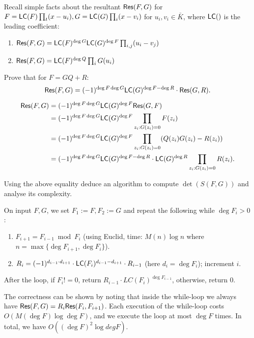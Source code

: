 \documentclass[11pt]{exam}
\theoremstyle{definition}
\begin{document}
{	 Recall simple facts about the resultant $\mathsf{Res}(F,G)$ for $F = \mathsf{LC}(F) \prod_t (x-u_i), G = \mathsf{LC}(G) \prod_i(x-v_i)$ for $u_i, v_i \in \bar{K}$, where $\mathsf{LC}()$ is the leading coefficient:
	\begin{enumerate}
		\item $\mathsf{Res}(F,G) = \mathsf{LC}(F)^{\deg G} \mathsf{LC}(G)^{\deg F} \prod_{i,j}(u_i - v_j)$
		\item $\mathsf{Res}(F,G) = \mathsf{LC}(F)^{\deg Q} \prod_i G(u_i)$
	\end{enumerate}
	\begin{questions}
	\question Prove that for $F = GQ + R$:
	\[
		\mathsf{Res}(F, G) = (-1)^{\deg F \deg G} \mathsf{LC}(G)^{\deg F - \deg R} \cdot \mathsf{Res}(G,R).
	\]
	\vspace{-20pt}
	\begin{solution}
		\vspace{-20pt}
		\begin{align*}
			\mathsf{Res}(F,G) &= (-1)^{\deg F \deg G} \mathsf{LC}(G)^{\deg F} \mathsf{Res}(G,F) \\
			& = (-1)^{\deg F \deg G} \mathsf{LC}(G)^{\deg F} \prod_{z_i : G(z_i)=0} F(z_i) \\
			& = (-1)^{\deg F \deg G} \mathsf{LC}(G)^{\deg F} \prod_{z_i : G(z_i)=0} (Q(z_i)G(z_i) - R(z_i)) \\
			& = (-1)^{\deg F \deg G} \mathsf{LC}(G)^{\deg F - \deg R} \cdot \mathsf{LC}(G)^{\deg R} \prod_{z_i : G(z_i)=0} R(z_i).
		\end{align*}
			
	\end{solution}
	\question Using the above equality deduce an algorithm to compute $\det(S(F,G))$ and analyse its complexity. 
	\begin{solution}
		On input $F, G$, we set $F_1 :=F, F_2:=G$ and repeat the following while $\deg F_i >0$: 
		\begin{enumerate}
			\item $F_{i+1} = F_{i-1} \bmod F_i$ (using Euclid, time: $M(n) \log n$ where $n=\max\{\deg F_{i+1}, \deg F_i\}$).
			\item $R_i = (-1)^{d_{i-1} \cdot d_{i+1}} \cdot \mathsf{LC}(F_i)^{d_{i-1} - d_{i+1}} \cdot R_{i-1}$ (here $d_i = \deg F_i$); increment $i$. 
		\end{enumerate}
		After the loop, if $F_i!=0$, return $R_{i-1}\cdot LC(F_i)^{\deg F_{i-1}}$, otherwise, return 0.
		
		The correctness can be shown by noting that inside the while-loop we always have $\mathsf{Res}(F,G) = R_i \mathsf{Res}(F_i, F_{i+1})$. Each execution of the while-loop costs $O(M(\deg F)\log \deg F)$, and we execute the loop at most $\deg F$ times. In total, we have $O((\deg F)^2 \log deg F)$.
	\end{solution}
\end{questions}

}
\end{document}
